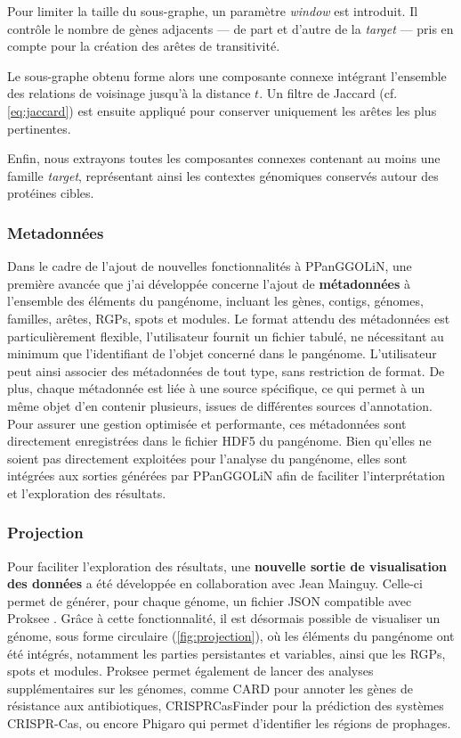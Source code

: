 Pour limiter la taille du sous-graphe, un paramètre \textit{window} est introduit. Il contrôle le nombre de gènes adjacents — de part et d'autre de la \textit{target} — pris en compte pour la création des arêtes de transitivité.

Le sous-graphe obtenu forme alors une composante connexe intégrant l’ensemble des relations de voisinage jusqu’à la distance $t$. Un filtre de Jaccard (cf. \autoref{eq:jaccard}) est ensuite appliqué pour conserver uniquement les arêtes les plus pertinentes.

Enfin, nous extrayons toutes les composantes connexes contenant au moins une famille \textit{target}, représentant ainsi les contextes génomiques conservés autour des protéines cibles.

\subsubsection{Metadonnées}

Dans le cadre de l'ajout de nouvelles fonctionnalités à PPanGGOLiN, une première avancée que j'ai développée concerne l'ajout de \textbf{métadonnées} à l'ensemble des éléments du pangénome, incluant les gènes, contigs, génomes, familles, arêtes, RGPs, spots et modules. Le format attendu des métadonnées est particulièrement flexible, l'utilisateur fournit un fichier tabulé, ne nécessitant au minimum que l'identifiant de l'objet concerné dans le pangénome.  L’utilisateur peut ainsi associer des métadonnées de tout type, sans restriction de format. De plus, chaque métadonnée est liée à une source spécifique, ce qui permet à un même objet d’en contenir plusieurs, issues de différentes sources d’annotation. Pour assurer une gestion optimisée et performante, ces métadonnées sont directement enregistrées dans le fichier HDF5 du pangénome. Bien qu'elles ne soient pas directement exploitées pour l'analyse du pangénome, elles sont intégrées aux sorties générées par PPanGGOLiN afin de faciliter l'interprétation et l'exploration des résultats.

\subsubsection{Projection}

Pour faciliter l'exploration des résultats, une \textbf{nouvelle sortie de visualisation des données} a été développée en collaboration avec Jean Mainguy. Celle-ci permet de générer, pour chaque génome, un fichier JSON compatible avec Proksee \cite{grant_proksee_2023}. Grâce à cette fonctionnalité, il est désormais possible de visualiser un génome, sous forme circulaire (\autoref{fig:projection}), où les éléments du pangénome ont été intégrés, notamment les parties persistantes et variables, ainsi que les RGPs, spots et modules. Proksee permet également de lancer des analyses supplémentaires sur les génomes, comme CARD \cite{alcock_card_2023} pour annoter les gènes de résistance aux antibiotiques, CRISPRCasFinder \cite{couvin_crisprcasfinder_2018} pour la prédiction des systèmes CRISPR-Cas, ou encore Phigaro \cite{starikova_phigaro_2020} qui permet d'identifier les régions de prophages. 

